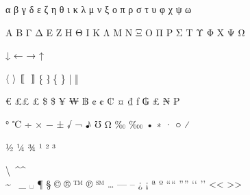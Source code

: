 \documentclass{article}
\begin{document}
\textalpha α
\textbeta β
\textgamma γ
\textdelta δ
\textepsilon ε
\textzeta ζ
\texteta η
\texttheta θ
\textiota ι
\textkappa κ
\textlambda λ
\textmu μ
\textnu ν
\textxi ξ
\textomikron ο
\textpi π
\textrho ρ
\textsigma σ
\texttau τ
\textupsilon υ
\textphi φ
\textchi χ
\textpsi ψ
\textomega ω

\textAlpha Α
\textBeta Β
\textGamma Γ
\textDelta Δ
\textEpsilon Ε
\textZeta Ζ
\textEta Η
\textTheta Θ
\textIota Ι
\textKappa Κ
\textLambda Λ
\textMu Μ
\textNu Ν
\textXi Ξ
\textOmikron Ο
\textPi Π
\textRho Ρ
\textSigma Σ
\textTau Τ
\textUpsilon Υ
\textPhi Φ
\textChi Χ
\textPsi Ψ
\textOmega Ω

\textdownarrow ↓
\textleftarrow ←
\textrightarrow →
\textuparrow ↑

\textlangle 〈
\textrangle 〉
\textlbrackdbl 〚
\textrbrackdbl 〛
\textlquill ⁅
\textrquill ⁆
\textbraceleft \{
\textbraceright \}
\textbar |
\textbardbl ‖

\texteuro €
\pounds £
\textsterling £
\textdollar \$
\textdollaroldstyle \$
\textyen ¥
\textwon ₩
\textbaht ฿
\textcent ¢
\textcentoldstyle ¢
\textcolonmonetary ₡
\textcurrency ¤
\textdong ₫
\textflorin ƒ
\textguarani ₲
\textlira ₤
\textnaira ₦
\textpeso ₱

\textdegree °
\textcelsius ℃
\textdiv ÷
\texttimes ×
\textminus −
\textpm ±
\textsurd √
\textlnot ¬
\textmusicalnote ♪
\textmho ℧
\textohm Ω
\textperthousand ‰
\textpertenthousand ‱
\textbullet •
\textasteriskcentered ∗
\textperiodcentered ·
\textbigcircle ○
\textfractionsolidus ⁄

\textonehalf ½
\textonequarter ¼
\textthreequarters ¾
\textonesuperior ¹
\texttwosuperior ²
\textthreesuperior ³

\textbackslash \
\textasciicircum ^ \\
\textasciitilde ~
\textunderscore \_
\textvisiblespace ␣
\textparagraph ¶
\textsection §
\textcopyright ©
\textregistered ®
\texttrademark ™
\textcircledP ℗
\textservicemark ℠
\textellipsis …
\textemdash —
\textendash –
\textquestiondown ¿
\textexclamdown ¡
\textordfeminine ª
\textordmasculine º
\textquotedblleft “
\textquotedblright ”
\textquoteleft ‘
\textquoteright ’
\textless <
\textgreater >
\end{document}
